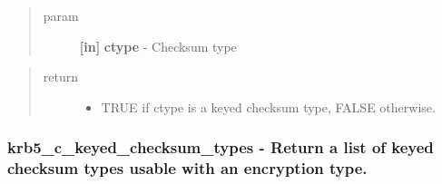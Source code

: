\documentclass[letterpaper,10pt,english]{sphinxmanual}
\begin{document}
\begin{quote}\begin{description}
\item[{param}] \leavevmode
\textbf{{[}in{]}} \textbf{ctype} - Checksum type

\end{description}\end{quote}
\begin{quote}\begin{description}
\item[{return}] \leavevmode\begin{itemize}
\item {} 
TRUE if ctype is a keyed checksum type, FALSE otherwise.

\end{itemize}

\end{description}\end{quote}


\subsubsection{krb5\_c\_keyed\_checksum\_types -  Return a list of keyed checksum types usable with an encryption type.}
\label{appdev/refs/api/krb5_c_keyed_checksum_types::doc}\label{appdev/refs/api/krb5_c_keyed_checksum_types:krb5-c-keyed-checksum-types-return-a-list-of-keyed-checksum-types-usable-with-an-encryption-type}

\begin{fulllineitems}
\label{appdev/refs/api/krb5_c_keyed_checksum_types:krb5_c_keyed_checksum_types}
\end{fulllineitems}
\end{document}
